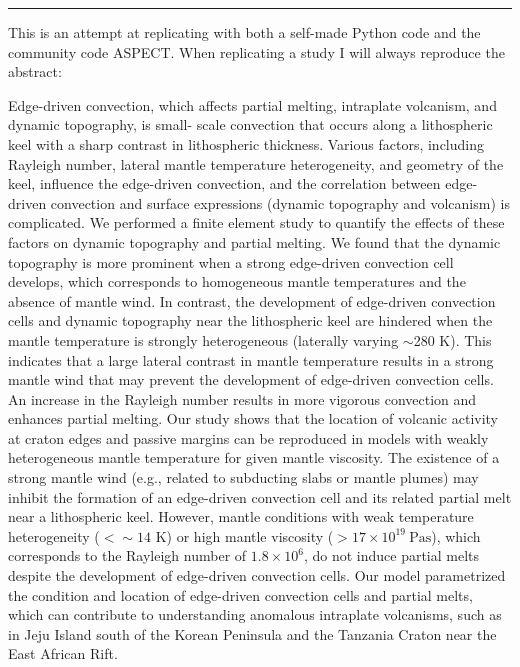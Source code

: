 \par\noindent\rule{\textwidth}{0.4pt}


This is an attempt at replicating  with both a self-made Python code and the 
community code ASPECT.
When replicating a study I will always reproduce the abstract:
\begin{displayquote}
{\color{darkgray}
Edge-driven convection, which affects partial melting, intraplate volcanism, and dynamic topography, is small-
scale convection that occurs along a lithospheric keel with a sharp contrast in lithospheric thickness. Various
factors, including Rayleigh number, lateral mantle temperature heterogeneity, and geometry of the keel, 
influence the edge-driven convection, and the correlation between edge-driven convection and surface expressions
(dynamic topography and volcanism) is complicated. We performed a finite element study to quantify the effects
of these factors on dynamic topography and partial melting. We found that the dynamic topography is more
prominent when a strong edge-driven convection cell develops, which corresponds to homogeneous mantle
temperatures and the absence of mantle wind. In contrast, the development of edge-driven convection cells and
dynamic topography near the lithospheric keel are hindered when the mantle temperature is strongly 
heterogeneous (laterally varying $\sim$280 K). This indicates that a large lateral contrast 
in mantle temperature results in a
strong mantle wind that may prevent the development of edge-driven convection cells. An increase in the
Rayleigh number results in more vigorous convection and enhances partial melting. Our study shows that the
location of volcanic activity at craton edges and passive margins can be reproduced in models with weakly
heterogeneous mantle temperature for given mantle viscosity. The existence of a strong mantle wind (e.g.,
related to subducting slabs or mantle plumes) may inhibit the formation of an edge-driven convection cell and its
related partial melt near a lithospheric keel. However, mantle conditions with weak temperature heterogeneity
($< \sim 14$ K) or high mantle viscosity ($> 17\times 10^{19}~\si{\pascal\second}$), which corresponds 
to the Rayleigh number of $1.8\times 10^6$,
do not induce partial melts despite the development of edge-driven convection cells. Our model parametrized the
condition and location of edge-driven convection cells and partial melts, which can contribute to understanding
anomalous intraplate volcanisms, such as in Jeju Island south of the Korean Peninsula and the Tanzania Craton
near the East African Rift.}
\end{displayquote}

